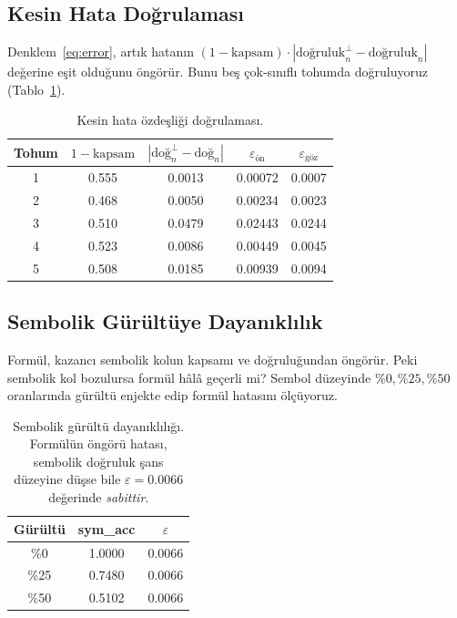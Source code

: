 \documentclass[11pt,a4paper]{article}
\begin{document}
\subsection{Kesin Hata Doğrulaması}
Denklem~\ref{eq:error}, artık hatanın
$(1-\text{kapsam}) \cdot |\text{doğruluk}_n^{\perp} - \text{doğruluk}_n|$
değerine eşit olduğunu öngörür. Bunu beş çok-sınıflı tohumda
doğruluyoruz (Tablo~\ref{tab:hata}).

\begin{table}[ht]
\centering
\caption{Kesin hata özdeşliği doğrulaması.}
\label{tab:hata}
\small
\begin{tabular}{ccccc}
\toprule
Tohum & $1-\text{kapsam}$ & $|\text{doğ}_n^{\perp} - \text{doğ}_n|$ & $\varepsilon_\text{ön}$ & $\varepsilon_\text{göz}$ \\
\midrule
1 & 0.555 & 0.0013 & 0.00072 & 0.0007 \\
2 & 0.468 & 0.0050 & 0.00234 & 0.0023 \\
3 & 0.510 & 0.0479 & 0.02443 & 0.0244 \\
4 & 0.523 & 0.0086 & 0.00449 & 0.0045 \\
5 & 0.508 & 0.0185 & 0.00939 & 0.0094 \\
\bottomrule
\end{tabular}
\end{table}


\subsection{Sembolik Gürültüye Dayanıklılık}
\label{sec:robustness}

Formül, kazancı sembolik kolun kapsamı ve doğruluğundan öngörür.
Peki sembolik kol bozulursa formül hâlâ geçerli mi? Sembol düzeyinde
$\%0, \%25, \%50$ oranlarında gürültü enjekte edip formül hatasını
ölçüyoruz.

\begin{table}[ht]
\centering
\caption{Sembolik gürültü dayanıklılığı. Formülün öngörü hatası,
sembolik doğruluk şans düzeyine düşse bile $\varepsilon = 0.0066$
değerinde \emph{sabittir}.}
\label{tab:noise}
\small
\begin{tabular}{ccc}
\toprule
Gürültü & sym\_acc & $\varepsilon$ \\
\midrule
\%0  & 1.0000 & 0.0066 \\
\%25 & 0.7480 & 0.0066 \\
\%50 & 0.5102 & 0.0066 \\
\bottomrule
\end{tabular}
\end{table}
\end{document}

